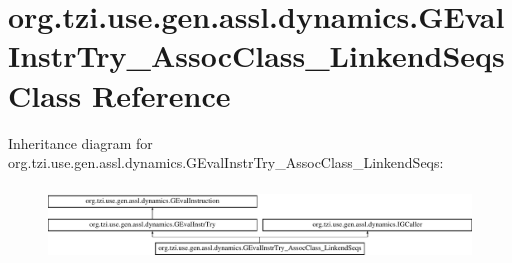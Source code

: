 \hypertarget{classorg_1_1tzi_1_1use_1_1gen_1_1assl_1_1dynamics_1_1_g_eval_instr_try___assoc_class___linkend_seqs}{\section{org.\-tzi.\-use.\-gen.\-assl.\-dynamics.\-G\-Eval\-Instr\-Try\-\_\-\-Assoc\-Class\-\_\-\-Linkend\-Seqs Class Reference}
\label{classorg_1_1tzi_1_1use_1_1gen_1_1assl_1_1dynamics_1_1_g_eval_instr_try___assoc_class___linkend_seqs}
}
Inheritance diagram for org.\-tzi.\-use.\-gen.\-assl.\-dynamics.\-G\-Eval\-Instr\-Try\-\_\-\-Assoc\-Class\-\_\-\-Linkend\-Seqs\-:\begin{figure}[H]
\begin{center}
\leavevmode
\includegraphics[height=2.004773cm]{classorg_1_1tzi_1_1use_1_1gen_1_1assl_1_1dynamics_1_1_g_eval_instr_try___assoc_class___linkend_seqs}
\end{center}
\end{figure}
